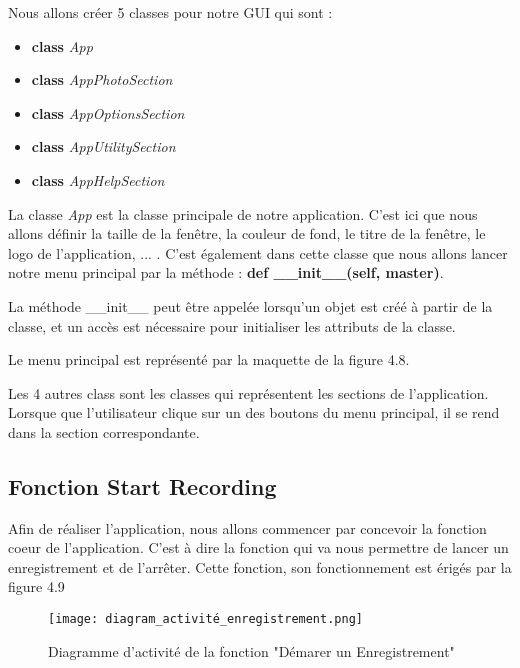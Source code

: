            \begin{flushleft}
                Nous allons créer 5 classes pour notre GUI qui sont :
                \begin{itemize}
                    \item \textbf{class} \textit{App}
                    \item \textbf{class} \textit{AppPhotoSection}
                    \item \textbf{class} \textit{AppOptionsSection}
                    \item \textbf{class} \textit{AppUtilitySection}
                    \item \textbf{class} \textit{AppHelpSection}
                \end{itemize}
                
                La classe \textit{App} est la classe principale de notre application.
                C'est ici que nous allons définir la taille de la fenêtre, la couleur de fond, le titre de la fenêtre, le logo de l'application, ... .
                C'est également dans cette classe que nous allons lancer notre menu principal par la méthode : \textbf{def \_\_init\_\_(self, master)}.
            
                La méthode \_\_init\_\_ peut être appelée lorsqu'un objet est créé à partir de la classe, et un accès est nécessaire pour initialiser les attributs de la classe.

                \vspace{0.2cm}

                Le menu principal est représenté par la maquette de la figure 4.8.

                \vspace{0.2cm}

                Les 4 autres class sont les classes qui représentent les sections de l'application.
                Lorsque que l'utilisateur clique sur un des boutons du menu principal, il se rend dans la section correspondante.


            \end{flushleft}
        
        \vspace{1cm}

        \subsection{Fonction Start Recording}
            Afin de réaliser l'application, nous allons commencer par concevoir la fonction coeur de l'application.
            C'est à dire la fonction qui va nous permettre de lancer un enregistrement et de l'arrêter.    
            Cette fonction, son fonctionnement est érigés par la figure 4.9
            \begin{figure}[h]
                \centering
                \texttt{[image: diagram\_activité\_enregistrement.png]} 
                \caption{Diagramme d'activité de la fonction "Démarer un Enregistrement"}
            \end{figure}

